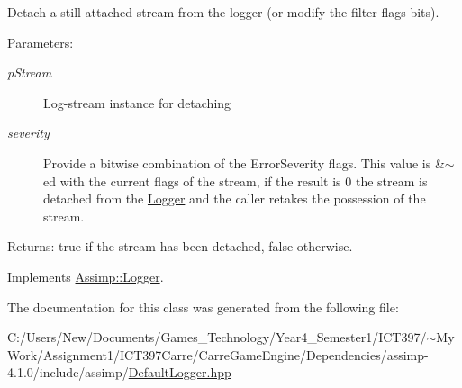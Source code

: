 Detach a still attached stream from the logger (or modify the filter flags bits). 

\begin{Desc}
\item[Parameters:]
\begin{description}
\item[{\em pStream}]Log-stream instance for detaching \item[{\em severity}]Provide a bitwise combination of the ErrorSeverity flags. This value is \&$\sim$ed with the current flags of the stream, if the result is 0 the stream is detached from the \hyperlink{class_assimp_1_1_logger}{Logger} and the caller retakes the possession of the stream. \end{description}
\end{Desc}
\begin{Desc}
\item[Returns:]true if the stream has been detached, false otherwise. \end{Desc}
 

Implements \hyperlink{class_assimp_1_1_logger_9489263727f29fecbd705d5c8d2590c0}{Assimp::Logger}.

The documentation for this class was generated from the following file:\begin{CompactItemize}
\item 
C:/Users/New/Documents/Games\_\-Technology/Year4\_\-Semester1/ICT397/$\sim$My Work/Assignment1/ICT397Carre/CarreGameEngine/Dependencies/assimp-4.1.0/include/assimp/\hyperlink{_default_logger_8hpp}{DefaultLogger.hpp}\end{CompactItemize}
